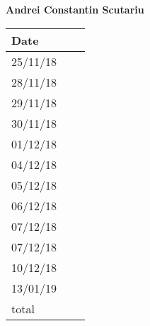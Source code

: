 \documentclass[../main.tex]{subfiles}
\begin{document}
\begin{center}
{\bf Andrei Constantin Scutariu}
	\vspace{2mm}

		\begin{tabular}{p{1.3cm}|p{1.8cm}|p{6.7cm}}
			\hline
			\bf Date & \bf \makebox[1.8cm][c]{Hours} & \bf \makebox[6.7cm][c]{Description} \\
			\hline
			25/11/18 & \makebox[1.8cm][c]{0.5h} & \makebox[6.7cm][c]{Initial Structure}\\
			28/11/18 & \makebox[1.8cm][c]{0.5h} & \makebox[6.7cm][c]{Introduction}\\
			29/11/18 & \makebox[1.8cm][c]{2h} & \makebox[6.7cm][c]{Component view}\\
			30/11/18 & \makebox[1.8cm][c]{1h} & \makebox[6.7cm][c]{Component view}\\
			01/12/18 & \makebox[1.8cm][c]{1h} & \makebox[6.7cm][c]{Requirements traceability}\\
			04/12/18 & \makebox[1.8cm][c]{2h} & \makebox[6.7cm][c]{Reviewing}\\
			05/12/18 & \makebox[1.8cm][c]{2h} & \makebox[6.7cm][c]{Architectural styles and patterns}\\
			06/12/18 & \makebox[1.8cm][c]{4h} & \makebox[6.7cm][c]{Component Interfaces}\\
			07/12/18 & \makebox[1.8cm][c]{1h} & \makebox[6.7cm][c]{Component view}\\
			07/12/18 & \makebox[1.8cm][c]{1h} & \makebox[6.7cm][c]{Reviewing}\\
			10/12/18 & \makebox[1.8cm][c]{3h} & \makebox[6.7cm][c]{Reviewing}\\
			13/01/19 & \makebox[1.8cm][c]{1h} & \makebox[6.7cm][c]{Reviewing}\\
			total    & \makebox[1.8cm][c]{19h}
		\end{tabular}
\end{center}
\vspace{1cm}
\end{document}
